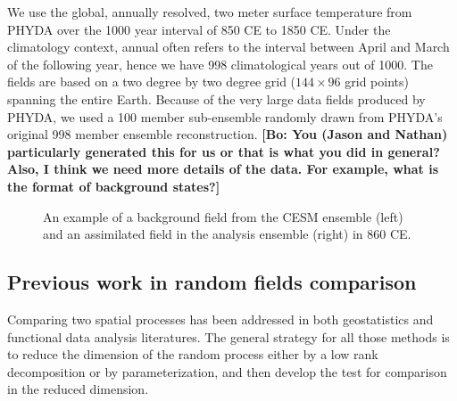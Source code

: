 \documentclass[12pt]{article}
\newcommand{\bl}[1]{\color{Red}\textbf{[Bo: #1]}\normalcolor}
\begin{document}
We use the global, annually resolved, two meter surface temperature from PHYDA over the 1000 year interval of 850 CE to 1850 CE. 
Under the climatology context, annual often refers to the interval between April and March of the following year, hence we have 998 climatological years out of 1000.
The fields are based on a two degree by two degree grid ($144 \times 96$ grid points) spanning the entire Earth. Because of the very large data fields produced by PHYDA, we used a 100 member sub-ensemble randomly drawn from PHYDA's original 998 member ensemble reconstruction. \bl{You (Jason and Nathan) particularly generated this for us or that is what you did in general? Also, I think we need more details of the data. For example, what is the format of background states?}

\begin{figure}
 \centering
  \caption{An example of a background field from the CESM ensemble (left) and an assimilated field in the analysis ensemble (right) in 860 CE.}
  \label{fig:example}
\end{figure}

\subsection{Previous work in random fields comparison} \label{previous}
Comparing two spatial processes has been addressed in both geostatistics and functional data analysis literatures. The general strategy for all those methods is to reduce the dimension of the random process either by a low rank decomposition or  by parameterization, and then develop the test for comparison in the reduced dimension.
\end{document}
